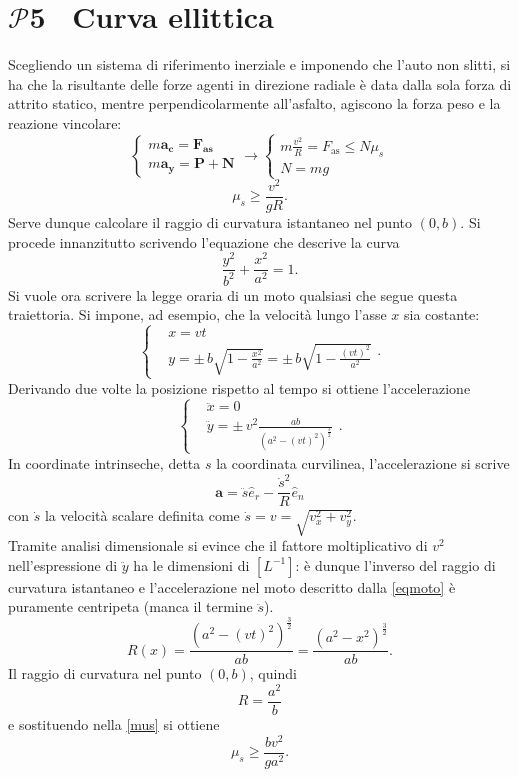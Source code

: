 \documentclass[a4paper,12pt]{article}
\newcommand{\problemtitle}[1]{
  \noindent
  \textbf{\Large #1}\hspace{0.5em}
  \raisebox{0.6ex}{\rule{\linewidth - \widthof{\textbf{\Large #1}} - 0.6em}{0.4pt}}%
}
\begin{document}
\section*{\problemtitle{$\mathcal{P}${\small{5}} \ Curva ellittica}}
Scegliendo un sistema di riferimento inerziale e imponendo che l'auto non slitti, si ha che la risultante delle forze agenti  in direzione radiale è data dalla sola forza di attrito statico, mentre perpendicolarmente all'asfalto, agiscono la forza peso e la reazione vincolare:
\[
\begin{cases}
m\boldsymbol{a_c} = \mathbf{F_\text{as}} \\
m\boldsymbol{a_y} = \mathbf{P} + \mathbf{N} 
\end{cases}
\rightarrow
\begin{cases}
m\frac{v^2}{R} = F_\text{as} \leq N\mu_s \\
N = mg
\end{cases}
\tag{5.0}
\]
\[
\mu_s \geq \frac{v^2}{gR}.
\tag{5.1}
\label{mus}
\]
Serve dunque calcolare il raggio di curvatura istantaneo nel punto $(0,b)$. Si procede innanzitutto scrivendo l'equazione che descrive la curva
\[
\frac{y^2}{b^2} + \frac{x^2}{a^2} = 1.
\tag{5.2}
\]
Si vuole ora scrivere la legge oraria di un moto qualsiasi che segue questa traiettoria. Si impone, ad esempio, che la velocità lungo l'asse $x$ sia costante:
\[
\left\{
\begin{aligned}
& x = vt \\
& y = \pm \, b\sqrt{1-\frac{x^2}{a^2}} = \pm \, b\sqrt{1-\frac{(vt)^2}{a^2}}
\end{aligned}
\right.
.
\tag{5.3}
\label{eqmoto}
\]
Derivando due volte la posizione rispetto al tempo si ottiene l'accelerazione
\[
\left\{
\begin{aligned}
& \ddot{x} = 0 \\
& \ddot{y} = \pm \, v^2 \frac{ab}{(a^2-(vt)^2)^{\frac{3}{2}}}
\end{aligned}
\right.
.
\tag{5.4}
\]
In coordinate intrinseche, detta $s$ la coordinata curvilinea, l'accelerazione si scrive 
\[
\mathbf{a} = \ddot{s} \hat{e}_r - \frac{\dot{s}^2}{R} \hat{e}_n
\tag{5.5}
\]
con $\dot{s}$ la velocità scalare definita come $\dot{s} = v = \sqrt{v_x^2+v_y^2}$. \\
Tramite analisi dimensionale si evince che il fattore moltiplicativo di $v^2$ nell'espressione di $\ddot{y}$ ha le dimensioni di $[L^{-1}]$: è dunque l'inverso del raggio di curvatura istantaneo e l'accelerazione nel moto descritto dalla  \ref{eqmoto} è puramente centripeta (manca il termine $\ddot{s}$). 
\[
R(x) = \frac{(a^2-(vt)^2)^{\frac{3}{2}}}{ab} = \frac{(a^2-x^2)^{\frac{3}{2}}}{ab}. \tag{5.6}
\]
Il raggio di curvatura nel punto $(0,b)$, quindi
\[
R = \frac{a^2}{b} \tag{5.7}
\]
e sostituendo nella \ref{mus} si ottiene 
\[
\mu_s \geq \frac{bv^2}{ga^2}. \tag{5.8}
\]
\end{document}
